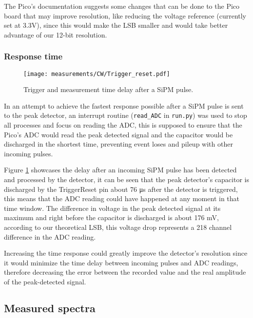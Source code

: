 The Pico's documentation \cite{datasheet2024RpPico} suggests some changes that can be done to the Pico board that may improve resolution, like reducing the voltage reference (currently set at 3.3V), since this would make the LSB smaller and would take better advantage of our 12-bit resolution.

\subsubsection{Response time}

\begin{figure}[H]
  \centering
  \texttt{[image: measurements/CW/Trigger\_reset.pdf]}
  \caption{\label{fig:measurement_speed}Trigger and measurement time delay after a SiPM pulse.}
\end{figure}

In an attempt to achieve the fastest response possible after a SiPM pulse is sent to the peak detector, an interrupt routine (\texttt{read\_ADC} in \texttt{run.py}) was used to stop all processes and focus on reading the ADC, this is supposed to ensure that the Pico's ADC would read the peak detected signal and the capacitor would be discharged in the shortest time, preventing event loses and pileup with other incoming pulses. 

Figure \ref{fig:measurement_speed} showcases the delay after an incoming SiPM pulse has been detected and processed by the detector, it can be seen that the peak detector's capacitor is discharged by the TriggerReset pin about 76 \unit{\micro\s} after the detector is triggered, this means that the ADC reading could have happened at any moment in that time window. The difference in voltage in the peak detected signal at its maximum and right before the capacitor is discharged is about 176 \unit{\mV}, according to our theoretical LSB, this voltage drop represents a 218 channel difference in the ADC reading.

Increasing the time response could greatly improve the detector's resolution since it would minimize the time delay between incoming pulses and ADC readings, therefore decreasing the error between the recorded value and the real amplitude of the peak-detected signal.

\subsection{Measured spectra}

